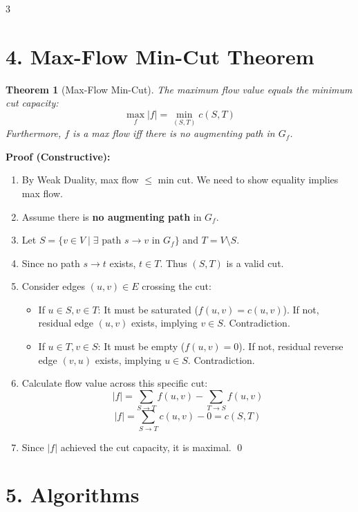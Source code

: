 \documentclass[10pt, a4paper]{article}
\theoremstyle{compact}
\newtheorem*{theorem}{Theorem}
\begin{document}
\begin{multicols}{3}
\section{4. Max-Flow Min-Cut Theorem}

\begin{theorem}[Max-Flow Min-Cut]
The maximum flow value equals the minimum cut capacity:
$$\max_f |f| = \min_{(S,T)} c(S,T)$$
Furthermore, $f$ is a max flow iff there is no augmenting path in $G_f$.
\end{theorem}

\textbf{Proof (Constructive):}
\begin{enumerate}
    \item By Weak Duality, max flow $\le$ min cut. We need to show equality implies max flow.
    \item Assume there is \textbf{no augmenting path} in $G_f$.
    \item Let $S = \{v \in V \mid \exists \text{ path } s \to v \text{ in } G_f\}$ and $T = V \setminus S$.
    \item Since no path $s \to t$ exists, $t \in T$. Thus $(S,T)$ is a valid cut.
    \item Consider edges $(u,v) \in E$ crossing the cut:
    \begin{itemize}
        \item If $u \in S, v \in T$: It must be saturated ($f(u,v) = c(u,v)$). If not, residual edge $(u,v)$ exists, implying $v \in S$. Contradiction.
        \item If $u \in T, v \in S$: It must be empty ($f(u,v) = 0$). If not, residual reverse edge $(v,u)$ exists, implying $u \in S$. Contradiction.
    \end{itemize}
    \item Calculate flow value across this specific cut:
    $$|f| = \sum_{S \to T} f(u,v) - \sum_{T \to S} f(u,v)$$
    $$|f| = \sum_{S \to T} c(u,v) - 0 = c(S,T)$$
    \item Since $|f|$ achieved the cut capacity, it is maximal. \qed
\end{enumerate}

\section{5. Algorithms}


\end{multicols}
\end{document}
